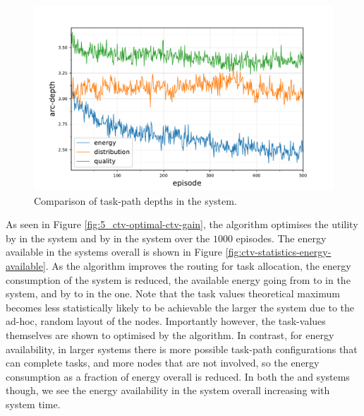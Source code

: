 \begin{figure}[ht]
	\begin{minipage}{.49\textwidth}
		\centering
		\includegraphics[width=1.0\linewidth,trim={25pt 0pt 50pt 0pt},clip]{5.19_ctv-arc-depth-comparison}
		\caption{Comparison of task-path depths  in the \simulationExtended{}{} system.}
		\label{fig:extended_arc_depth}
	\end{minipage}\hfill%
\begin{minipage}{.49\textwidth}
\end{minipage}
\end{figure}


As seen in Figure \ref{fig:5_ctv-optimal-ctv-gain}, the \algorithmBalanced{}{} algorithm optimises the utility by \resultsCTVBalancedDiff{}{}  in the \simulationSimple{}{} system and by \resultsCTVBalancedExtDiff{}{} in the \simulationExtended{}{} system over the $1000$ episodes. The energy available in the systems overall is shown in Figure \ref{fig:ctv-statistics-energy-available}. As the algorithm improves the routing for task allocation, the energy consumption of the system is reduced, the available energy going from \resultsEnergyBalancedStart{}{} to \resultsEnergyBalancedEnd{}{} in the \simulationSimple{}{} system, and by \resultsEnergyBalancedExtStart{}{} to \resultsEnergyBalancedExtEnd{}{} in the \simulationExtended{}{} one. Note that the task values theoretical maximum becomes less statistically likely to be achievable the larger the system due to the ad-hoc, random layout of the nodes. Importantly however, the task-values themselves are shown to optimised by the algorithm. In contrast, for energy availability, in larger systems there is more possible task-path configurations that can complete tasks, and more nodes that are not involved, so the  energy consumption as a fraction of energy overall is reduced. In both the \simulationSimple{}{} and \simulationExtended{}{} systems though, we see the energy availability in the system overall increasing with system time.

